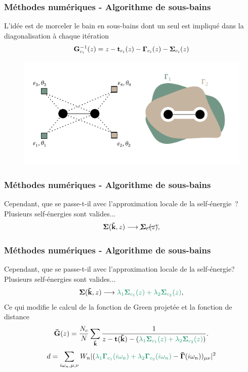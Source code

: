 \begin{frame}
    \frametitle{Méthodes numériques - Algorithme de sous-bains}
    L'idée est de morceler le bain en sous-bains dont un seul est impliqué dans
    la diagonalisation à chaque itération
    \begin{align}
      \vb{G}^{-1}_{c_i}(z) = z - \vb{t}_{c_i}(z) - \vb{\Gamma}_{c_i}(z) - \vb{\Sigma}_{c_i}(z)
    \end{align}
    \begin{figure}
         \centering
         \includegraphics[scale=0.75]{./figures/theory/1D_2s_4vb_bulks.pdf}
         \label{fig: amas_CDMFT_virtual}
    \end{figure}
\end{frame}

\begin{frame}
    \frametitle{Méthodes numériques - Algorithme de sous-bains}
    Cependant, que se passe-t-il avec l'approximation locale de la self-énergie~?
    Plusieurs self-énergies sont valides...
    \begin{align}
      \vb{\Sigma}(\vb{\tilde{k}}, z)\longrightarrow\cancel{\vb{\Sigma}_c(z)},
    \end{align}
\end{frame}

\begin{frame}
    \frametitle{Méthodes numériques - Algorithme de sous-bains}
    Cependant, que se passe-t-il avec l'approximation locale de la self-énergie?
    Plusieurs self-énergies sont valides...
    \begin{align}
      \vb{\Sigma}(\vb{\tilde{k}}, z)\longrightarrow\textcolor{vibrant_green}{\lambda_1\vb{\Sigma}_{c_1}(z) +
      \lambda_2\vb{\Sigma}_{c_2}(z)},
    \end{align}
    \pause
    Ce qui modifie le calcul de la fonction de Green projetée et la fonction de distance
    \begin{align}
        \vb{\Bar{G}}(z) = \frac{N_c}{N}\sum_{\vb{\tilde{k}}}\frac{1}{z - \vb{t}(\vb{\tilde{k}}) - (\textcolor{vibrant_green}{\lambda_1\vb{\Sigma}_{c_1}(z) +
        \lambda_2\vb{\Sigma}_{c_2}(z)})}.
    \end{align}
    \begin{align}
      d = \sum_{i\omega_n, \mu,\nu}W_n|(\textcolor{vibrant_green}{\lambda_1\vb{\Gamma}_{c_1}(i\omega_n) + \lambda_2\vb{\Gamma}_{c_2}(i\omega_n)} - \vb{\Bar{\Gamma}}(i\omega_n))_{\mu\nu}|^2
    \end{align}
\end{frame}

